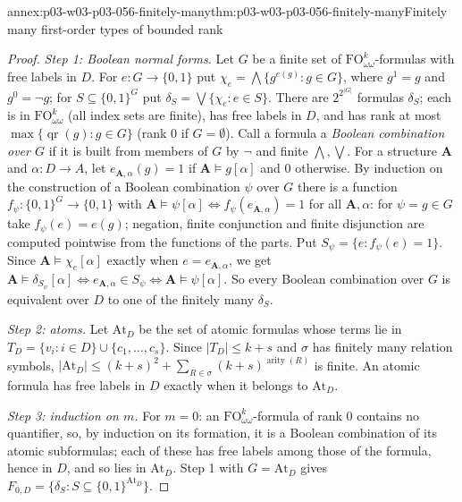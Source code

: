 \begin{annexitem}{annex:p03-w03-p03-056-finitely-many}{thm:p03-w03-p03-056-finitely-many}{Finitely many first-order types of bounded rank}
\begin{proof}
\emph{Step 1: Boolean normal forms.} Let \(G\) be a finite set of
\(\mathrm{FO}^k_{\omega\omega}\)-formulas with free labels in \(D\). For
\(e:G\to\{0,1\}\) put \(\chi_e=\bigwedge\{g^{e(g)}:g\in G\}\), where
\(g^1=g\) and \(g^0=\neg g\); for \(S\subseteq\{0,1\}^G\) put
\(\delta_S=\bigvee\{\chi_e:e\in S\}\). There are \(2^{2^{\lvert G\rvert}}\)
formulas \(\delta_S\); each is in \(\mathrm{FO}^k_{\omega\omega}\) (all index
sets are finite), has free labels in \(D\), and has rank at most
\(\max\{\operatorname{qr}(g):g\in G\}\) (rank \(0\) if \(G=\emptyset\)).
Call a formula a \emph{Boolean combination over \(G\)} if it is built from
members of \(G\) by \(\neg\) and finite \(\bigwedge,\bigvee\). For a
structure \(\mathbf A\) and \(\alpha:D\to A\), let
\(e_{\mathbf A,\alpha}(g)=1\) if \(\mathbf A\models g[\alpha]\) and \(0\)
otherwise. By induction on the construction of a Boolean combination
\(\psi\) over \(G\) there is a function \(f_\psi:\{0,1\}^G\to\{0,1\}\) with
\(\mathbf A\models\psi[\alpha]\iff f_\psi(e_{\mathbf A,\alpha})=1\) for all
\(\mathbf A,\alpha\): for \(\psi=g\in G\) take
\(f_\psi(e)=e(g)\); negation, finite conjunction and finite disjunction are
computed pointwise from the functions of the parts. Put
\(S_\psi=\{e:f_\psi(e)=1\}\). Since \(\mathbf A\models\chi_e[\alpha]\)
exactly when \(e=e_{\mathbf A,\alpha}\), we get
\(\mathbf A\models\delta_{S_\psi}[\alpha]\iff e_{\mathbf A,\alpha}\in S_\psi
\iff\mathbf A\models\psi[\alpha]\). So every Boolean combination over \(G\)
is equivalent over \(D\) to one of the finitely many \(\delta_S\).

\emph{Step 2: atoms.} Let \(\mathrm{At}_D\) be the set of atomic formulas
whose terms lie in \(T_D=\{v_i:i\in D\}\cup\{c_1,\ldots,c_s\}\). Since
\(\lvert T_D\rvert\leq k+s\) and \(\sigma\) has finitely many relation
symbols, \(\lvert\mathrm{At}_D\rvert\leq(k+s)^2+\sum_{R\in\sigma}
(k+s)^{\operatorname{arity}(R)}\) is finite. An atomic formula has free
labels in \(D\) exactly when it belongs to \(\mathrm{At}_D\).

\emph{Step 3: induction on \(m\).} For \(m=0\): an
\(\mathrm{FO}^k_{\omega\omega}\)-formula of rank \(0\) contains no
quantifier, so, by induction on its formation, it is a Boolean combination
of its atomic subformulas; each of these has free labels among those of the
formula, hence in \(D\), and so lies in \(\mathrm{At}_D\). Step 1 with
\(G=\mathrm{At}_D\) gives \(F_{0,D}=\{\delta_S:S\subseteq\{0,1\}^{\mathrm{At}_D}\}\).


\end{proof}
\end{annexitem}
